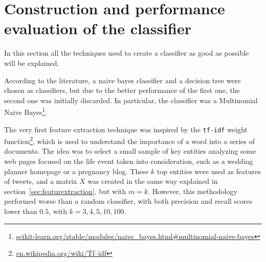 \section{Construction and performance evaluation of the classifier}
In this section all the techniques used to create a classifier as good as possible will be explained.

 According to the literature, a naive bayes classifier and a decision tree were chosen as classifiers, but due to the better performance of the first one, the second one was initially discarded. In particular, the classifier was a Multinomial Naive Bayes\footnote{\url{scikit-learn.org/stable/modules/naive_bayes.html#multinomial-naive-bayes}}.

The very first feature extraction technique was inspired by the \texttt{tf-idf} weight function\footnote{\url{en.wikipedia.org/wiki/Tf–idf}}, which is used to understand the importance of a word into a series of documents. The idea was to select a small sample of key entities analyzing some web pages focused on the life event taken into consideration, such as a wedding planner homepage or a pregnancy blog. These $k$ top entities were used as features of tweets, and a matrix $X$ was created in the same way explained in section~\ref{sec:featurextraction}, but with $m = k$. However, this methodology performed worse than a random classifier, with both precision and recall scores lower than $0.5$, with $k = 3, 4, 5, 10, 100$.

\begin{table}[htbp]
\centering
{}\qquad\qquad
{}
\caption{The performance of the naive bayes were satisfactory on a very balanced dataset. Unfortunatly, users' timelines are very unbalanced, and this classifier turned out to be inappropriate.}
\end{table}

